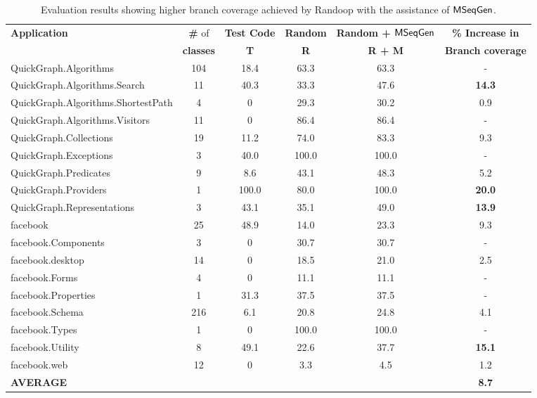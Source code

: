 \setlength{\tabcolsep}{1pt}
\begin{table*}[t]
\begin{SmallOut}
\begin{CodeOut}
\begin{center}
\begin {tabular} {|l|c|c|c|c|c|}
\hline
\textbf{Application} & \textbf{\#} of & \textbf{Test Code} & \textbf{Random} & \textbf{Random + $\textsf{MSeqGen} $} & \textbf{\% Increase in }\\
 & \textbf{classes} & \textbf{T} & \textbf{R} & \textbf{R + M} & \textbf{Branch coverage}\\
\hline
\hline QuickGraph.Algorithms & 104 & 18.4 & 63.3 & 63.3 & - \\
\hline QuickGraph.Algorithms.Search & 11 & 40.3 & 33.3 & 47.6 & \textbf{14.3} \\
\hline QuickGraph.Algorithms.ShortestPath & 4 & 0 & 29.3 & 30.2 & 0.9 \\
\hline QuickGraph.Algorithms.Visitors & 11 & 0 & 86.4 & 86.4 & - \\
\hline QuickGraph.Collections & 19 & 11.2 & 74.0 & 83.3 & 9.3 \\
\hline QuickGraph.Exceptions & 3 & 40.0 & 100.0 & 100.0 & - \\
\hline QuickGraph.Predicates & 9 & 8.6 & 43.1 & 48.3 & 5.2 \\
\hline QuickGraph.Providers & 1 & 100.0 & 80.0 & 100.0 & \textbf{20.0} \\
\hline QuickGraph.Representations & 3 & 43.1 & 35.1 & 49.0 & \textbf{13.9} \\
\hline facebook & 25 & 48.9 & 14.0 & 23.3 & 9.3 \\
\hline facebook.Components & 3 & 0 & 30.7 & 30.7 & - \\
\hline facebook.desktop & 14 & 0 & 18.5 & 21.0 & 2.5 \\
\hline facebook.Forms & 4 & 0 & 11.1 & 11.1 & - \\
\hline facebook.Properties & 1 & 31.3 & 37.5 & 37.5 & - \\
\hline facebook.Schema & 216 & 6.1 & 20.8 & 24.8 & 4.1 \\
\hline facebook.Types & 1 & 0 & 100.0 & 100.0 & - \\
\hline facebook.Utility & 8 & 49.1 & 22.6 & 37.7 & \textbf{15.1} \\
\hline facebook.web & 12 & 0 & 3.3 & 4.5 & 1.2 \\
\hline \textbf{AVERAGE} &  &  &  &  & \textbf{8.7} \\
\hline
\end{tabular}
\end{center}
\end{CodeOut}
\end{SmallOut}\vspace*{-4ex}
\centering \caption {\label{tab:premresults} Evaluation results showing higher branch coverage achieved by Randoop with the assistance of $\textsf{MSeqGen} $. }
\end{table*}

